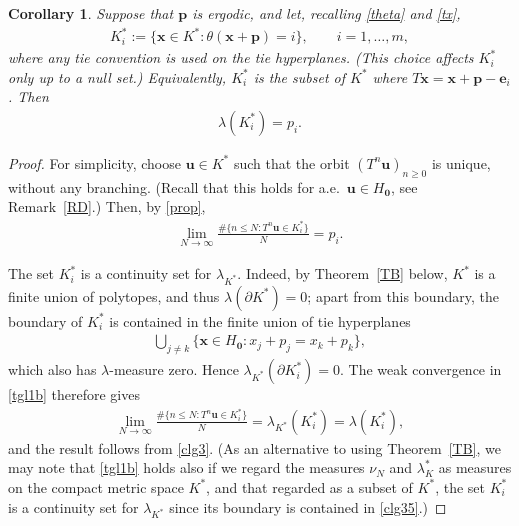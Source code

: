 \documentclass[11pt,reqno,tbtags,a4paper]{amsart}
\numberwithin{equation}{section}
\renewcommand\le{\leq}
\renewcommand\ge{\geq}
\renewcommand\leq{\leqslant}
\renewcommand\geq{\geqslant}
\theoremstyle{plain}%
\newtheorem{corollary}[theorem]{Corollary}
\theoremstyle{definition}
\theoremstyle{remark}
\newcommand{\refT}[1]{Theorem~\ref{#1}}
\newcommand{\refR}[1]{Remark~\ref{#1}}
\newcommand\set[1]{\ensuremath{\{#1\}}}
\newcommand\gl{\lambda}
\newcommand\Ho{H_{\0}}
\newcommand\ve{\mathbf{e}}
\newcommand\vp{\mathbf{p}}
\newcommand\vu{\mathbf{u}}
\newcommand\vx{\mathbf{x}}
\newcommand\Kx{K^*}
\newcommand\0{{\boldsymbol 0}}
\newcommand\1{{\boldsymbol 1}}
\begin{document}
\begin{corollary}\label{Cgl}
 Suppose that $\vp$ is ergodic, and let, recalling \eqref{theta} and \eqref{tx},
  \begin{align}\label{clg1}
    \Kx_i:=\set{\vx\in\Kx: \theta(\vx+\vp)=i},\qquad i=1,\dots,m,
  \end{align}
where any tie convention is used on the tie hyperplanes.  
(This choice affects $\Kx_i$ only up to a null set.)
Equivalently, $\Kx_i$ is the subset of $\Kx$ where
$T\vx=\vx+\vp-\ve_i$.  Then
\begin{align}\label{clg2}
  \gl(\Kx_i)=p_i.
\end{align}
\end{corollary}

\begin{proof}
  For simplicity, choose $\vu\in\Kx$ such that the orbit $(T^n\vu)_{n\ge0}$
is unique, without any branching. (Recall that this holds for a.e.\
$\vu\in\Ho$, see \refR{RD}.) Then, by \eqref{prop},
\begin{align}\label{clg3}
%
\lim_{N\to\infty}\frac{\#\set{n\le N:T^n\vu\in \Kx_i}}{N}
= p_i.
\end{align}

The set $\Kx_i$ is a continuity set for $\gl_{\Kx}$.  Indeed, by
Theorem~\ref{TB} below, $\Kx$ is a finite union of polytopes, and thus
$\gl(\partial\Kx)=0$; apart from this boundary, the boundary of $\Kx_i$ is
contained in the finite union of tie hyperplanes
\begin{align}\label{clg35}
\bigcup_{j\ne k}\set{\vx\in\Ho:x_j+p_j=x_k+p_k},
\end{align}
which also has $\gl$-measure zero.  Hence
$\gl_{\Kx}(\partial \Kx_i)=0$.  The weak convergence in \eqref{tgl1b}
therefore gives
\begin{align}
\lim_{N\to\infty}\frac{\#\set{n\le N:T^n\vu\in \Kx_i}}{N}
=\gl_{\Kx}(\Kx_i)=\gl(\Kx_i),
\end{align}
and the result follows from \eqref{clg3}.
(As an alternative to using \refT{TB}, we may 
note that \eqref{tgl1b} holds also if we 
regard the measures $\nu_N$ and $\gl_\Kx$ as measures on the compact metric
space $\Kx$, and that
regarded as a subset of $\Kx$,
the set $\Kx_i$ is a continuity set for $\gl_{\Kx}$
since its boundary is
contained in \eqref{clg35}.)
\end{proof}
\end{document}
